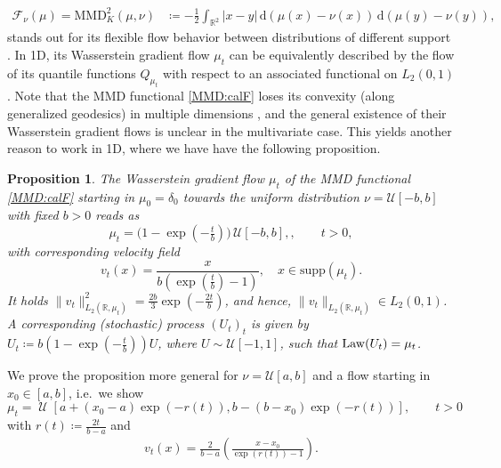 \documentclass{article}
\newcommand{\R}{\mathbb{R}}
\renewcommand{\d}{\, \mathrm{d}}
\newcommand{\supp}{\mathrm{supp}}
\DeclareMathOperator{\U}{\mathcal U}
\theoremstyle{plain}
\newtheorem{proposition}[theorem]{Proposition}
\theoremstyle{definition}
\theoremstyle{remark}
\begin{document}
    \begin{align}         \label{MMD:calF}
     \mathcal F_\nu(\mu) =   \text{MMD} ^2_{ K}(\mu,\nu) &\coloneqq 
        - \frac12 \int_{\R^2} |x-y| \d \left(\mu(x) - \nu(x) \right) \d \left(\mu(y) - \nu(y) \right )   ,    
\end{align}
stands out for its flexible flow behavior between distributions of different support \cite{HGBS2022}.
In 1D, its Wasserstein gradient flow $\mu_t$ can be equivalently described by the flow of its quantile functions $Q_{\mu_t}$ with respect to an associated functional on $L_2(0,1)$. Note that the MMD functional \eqref{MMD:calF} loses its convexity (along generalized geodesics) in multiple dimensions \cite{HGBS2022}, and the general existence of their Wasserstein gradient flows is unclear in the multivariate case. This yields another reason to work in 1D, where we have
have the following proposition. 

\begin{proposition}\label{prop2}
The Wasserstein gradient flow $\mu_t$ 
of the MMD functional \eqref{MMD:calF}
starting in $\mu_0 = \delta_0$ 
towards the uniform distribution $\nu = \mathcal{U}[-b, b]$ with fixed $b > 0$
reads as
\begin{equation}\label{MMD-diff}
        \mu_t
        = \big(1- \exp(-\tfrac{t}{b}) \big) \, 
        \mathcal{U}[-b ,b], 
        , \qquad t > 0,
\end{equation}
with corresponding velocity field 
\begin{equation} \label{MMD-velo}
        v_t(x)
        = \frac{x}{b \left( \exp\left(\frac{t}{b}\right) - 1\right)}, \quad x \in \supp(\mu_t).
    \end{equation}
It holds $\|v_t\|^2_{L_2(\R,\mu_t)} = \frac{2b}{3} \exp(-\frac{2t}{b})$, and hence, $\|v_t\|_{L_2(\R,\mu_t)} \in L_2(0,1)$.    
A corresponding (stochastic) process $(U_t)_t$ is given by 
$U_t \coloneqq b \left(1- \exp\left(-\frac{ t}{b} \right)\right)  U$, where $U \sim \mathcal{U}[-1,1]$, such that ${\rm Law} (U_t) = \mu_t$.
\end{proposition}

We prove the proposition more general for $\nu = \mathcal U[a,b]$ and a flow starting in $x_0 \in [a,b]$,
i.e.\ we show
\begin{equation} \label{eq:Dirac_to_Uniform}
        \mu_t
        = \U\left[ a + (x_0 - a) \exp\left(- r(t)\right),
        b - (b - x_0) \exp\left(- r(t) \right)
        \right], \qquad t>0
\end{equation}
with $r(t) \coloneqq \frac{2 t}{b - a}$ and
\begin{align}\label{xx}
        v_t(x)
        = \frac{2}{b - a} \left(\frac{x - x_0}{ \exp(  r(t)) -1} \right) .
\end{align} 
\end{document}
